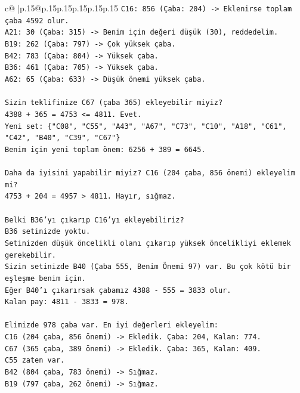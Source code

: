 \documentclass{article}
\begin{document}
{\begin{supertabular}{c@{$\;$}|p{.15\linewidth}@{}p{.15\linewidth}p{.15\linewidth}p{.15\linewidth}p{.15\linewidth}p{.15\linewidth}}
{{{\texttt{C16: 856 (Çaba: 204) {-}> Eklenirse toplam çaba 4592 olur.} \\
\texttt{A21: 30 (Çaba: 315) {-}> Benim için değeri düşük (30), reddedelim.} \\
\texttt{B19: 262 (Çaba: 797) {-}> Çok yüksek çaba.} \\
\texttt{B42: 783 (Çaba: 804) {-}> Yüksek çaba.} \\
\texttt{B36: 461 (Çaba: 705) {-}> Yüksek çaba.} \\
\texttt{A62: 65 (Çaba: 633) {-}> Düşük önemi yüksek çaba.} \\
\\ 
\texttt{Sizin teklifinize C67 (çaba 365) ekleyebilir miyiz?} \\
\texttt{4388 + 365 = 4753 <= 4811. Evet.} \\
\texttt{Yeni set: \{"C08", "C55", "A43", "A67", "C73", "C10", "A18", "C61", "C42", "B40", "C39", "C67"\}} \\
\texttt{Benim için yeni toplam önem: 6256 + 389 = 6645.} \\
\\ 
\texttt{Daha da iyisini yapabilir miyiz? C16 (204 çaba, 856 önemi) ekleyelim mi?} \\
\texttt{4753 + 204 = 4957 > 4811. Hayır, sığmaz.} \\
\\ 
\texttt{Belki B36'yı çıkarıp C16'yı ekleyebiliriz?} \\
\texttt{B36 setinizde yoktu.} \\
\texttt{Setinizden düşük öncelikli olanı çıkarıp yüksek öncelikliyi eklemek gerekebilir.} \\
\texttt{Sizin setinizde B40 (Çaba 555, Benim Önemi 97) var. Bu çok kötü bir eşleşme benim için.} \\
\texttt{Eğer B40'ı çıkarırsak çabamız 4388 {-} 555 = 3833 olur.} \\
\texttt{Kalan pay: 4811 {-} 3833 = 978.} \\
\\ 
\texttt{Elimizde 978 çaba var. En iyi değerleri ekleyelim:} \\
\texttt{C16 (204 çaba, 856 önemi) {-}> Ekledik. Çaba: 204, Kalan: 774.} \\
\texttt{C67 (365 çaba, 389 önemi) {-}> Ekledik. Çaba: 365, Kalan: 409.} \\
\texttt{C55 zaten var.} \\
\texttt{B42 (804 çaba, 783 önemi) {-}> Sığmaz.} \\
\texttt{B19 (797 çaba, 262 önemi) {-}> Sığmaz.} \\
}}}
\end{supertabular}}
\end{document}
